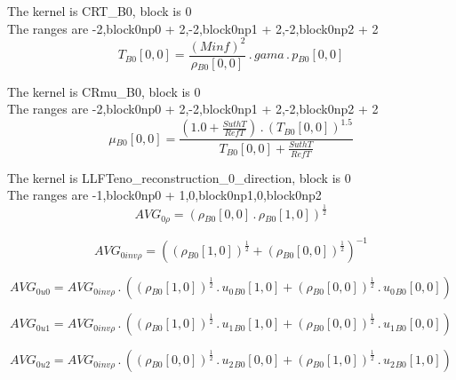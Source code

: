 \documentclass{article}
\begin{document}
\noindent The kernel is CRT_B0, block is 0\\\noindent The ranges are -2,block0np0 + 2,-2,block0np1 + 2,-2,block0np2 + 2\\\begin{dmath}{T{_{B0}}}[{0,0}] = \frac{\left(Minf \right)^{2}}{{\rho{_{B0}}}[{0,0}]} \,.\, gama \,.\, {p{_{B0}}}[{0,0}]\end{dmath}

\noindent The kernel is CRmu_B0, block is 0\\\noindent The ranges are -2,block0np0 + 2,-2,block0np1 + 2,-2,block0np2 + 2\\\begin{dmath}{\mu{_{B0}}}[{0,0}] = \frac{\left(1.0 + \frac{SuthT}{RefT}\right) \,.\, \left({T{_{B0}}}[{0,0}] \right)^{1.5}}{{T{_{B0}}}[{0,0}] + \frac{SuthT}{RefT}}\end{dmath}

\noindent The kernel is LLFTeno_reconstruction_0_direction, block is 0\\\noindent The ranges are -1,block0np0 + 1,0,block0np1,0,block0np2\\\begin{dmath}AVG_{0 \rho} = \left({\rho{_{B0}}}[{0,0}] \,.\, {\rho{_{B0}}}[{1,0}] \right)^{\frac{1}{2}}\end{dmath}

\begin{dmath}AVG_{0 inv \rho} = \left(\left({\rho{_{B0}}}[{1,0}] \right)^{\frac{1}{2}} + \left({\rho{_{B0}}}[{0,0}] \right)^{\frac{1}{2}} \right)^{-1}\end{dmath}

\begin{dmath}AVG_{0 u0} = AVG_{0 inv \rho} \,.\, \left(\left({\rho{_{B0}}}[{1,0}] \right)^{\frac{1}{2}} \,.\, {u_{0}{_{B0}}}[{1,0}] + \left({\rho{_{B0}}}[{0,0}] \right)^{\frac{1}{2}} \,.\, {u_{0}{_{B0}}}[{0,0}]\right)\end{dmath}

\begin{dmath}AVG_{0 u1} = AVG_{0 inv \rho} \,.\, \left(\left({\rho{_{B0}}}[{1,0}] \right)^{\frac{1}{2}} \,.\, {u_{1}{_{B0}}}[{1,0}] + \left({\rho{_{B0}}}[{0,0}] \right)^{\frac{1}{2}} \,.\, {u_{1}{_{B0}}}[{0,0}]\right)\end{dmath}

\begin{dmath}AVG_{0 u2} = AVG_{0 inv \rho} \,.\, \left(\left({\rho{_{B0}}}[{0,0}] \right)^{\frac{1}{2}} \,.\, {u_{2}{_{B0}}}[{0,0}] + \left({\rho{_{B0}}}[{1,0}] \right)^{\frac{1}{2}} \,.\, {u_{2}{_{B0}}}[{1,0}]\right)\end{dmath}
\end{document}

